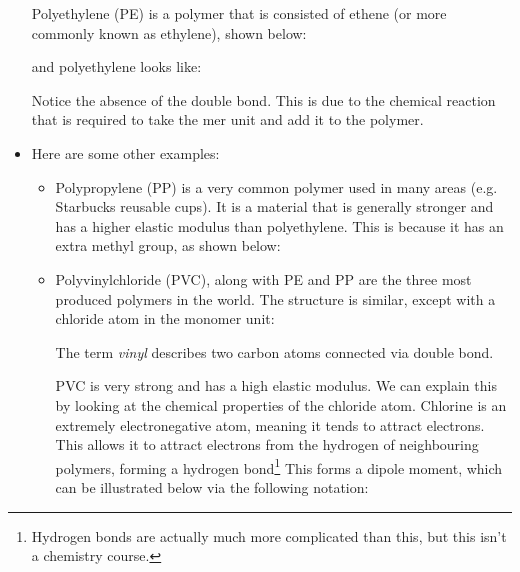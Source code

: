 \begin{itemize}
    \begin{case}
        Polyethylene (PE) is a polymer that is consisted of ethene (or more commonly known as ethylene), shown below:
        \begin{center}
        \end{center}
        and polyethylene looks like:
        \begin{center}
        \end{center}
        \vspace{2mm} %
        Notice the absence of the double bond. This is due to the chemical reaction that is required to take the mer unit and add it to the polymer.
    \end{case}
    \item Here are some other examples:
    \begin{itemize}
        \item  Polypropylene (PP) is a very common polymer used in many areas (e.g. Starbucks reusable cups). It is a material that is generally stronger and has a higher elastic modulus than polyethylene. This is because it has an extra  methyl group, as shown below:
        \begin{center}
        \end{center}
        \item Polyvinylchloride (PVC), along with PE and PP are the three most produced polymers in the world. The structure is similar, except with a chloride atom in the monomer unit:
        \begin{center}
        \end{center}
        The term \textit{vinyl} describes two carbon atoms connected via double bond.
    \begin{case}
        PVC is very strong and has a high elastic modulus. We can explain this by looking at the chemical properties of the chloride atom. Chlorine is an extremely electronegative atom, meaning it tends to attract electrons. This allows it to attract electrons from the hydrogen of neighbouring polymers, forming a hydrogen bond\footnote{Hydrogen bonds are actually much more complicated than this, but this isn't a chemistry course.} This forms a dipole moment, which can be illustrated below via the following notation:

\end{case}
\end{itemize}
\end{itemize}
